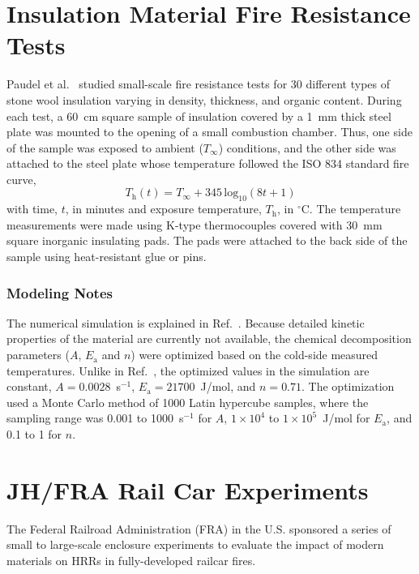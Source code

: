 \section{Insulation Material Fire Resistance Tests}
\label{Insulation_Materials_Description}

Paudel et al.~\cite{Paudel:2021} studied small-scale fire resistance tests for 30 different types of stone wool insulation varying in density, thickness, and organic content. During each test, a 60~cm square sample of insulation covered by a 1~mm thick steel plate was mounted to the opening of a small combustion chamber. Thus, one side of the sample was exposed to ambient ($ T_\infty $) conditions, and the other side was attached to the steel plate whose temperature followed the ISO 834 standard fire curve,
\begin{equation}
   T_\textrm{h}(t) = T_\infty + 345 \, \textrm{log}_{10}(8t + 1)
   \label{eq:isocurve}
\end{equation}
with time, $t$, in minutes and exposure temperature, $T_{\textrm{h}}$, in $^\circ$C. The temperature measurements were made using K-type thermocouples covered with 30~mm square inorganic insulating pads. The pads were attached to the back side of the sample using heat-resistant glue or pins.

\subsubsection{Modeling Notes}

The numerical simulation is explained in Ref.~\cite{Paudel:2021}. Because detailed kinetic properties of the material are currently not available, the chemical decomposition parameters ($A$, $E_{\textrm{a}}$ and $n$) were optimized based on the cold-side measured temperatures. Unlike in Ref.~\cite{Paudel:2021}, the optimized values in the simulation are constant, $A=0.0028$~s$^{-1}$, $E_{\textrm{a}}=21700$~J/mol, and $n=0.71$. The optimization used a Monte Carlo method of 1000 Latin hypercube samples, where the sampling range was 0.001 to 1000~s$^{-1}$ for $A$, $1\times10^4$ to $1\times10^5$~J/mol for $E_{\textrm{a}}$, and 0.1 to 1 for $n$.




\section{JH/FRA Rail Car Experiments}
\label{JH_FRA_Description}

The Federal Railroad Administration (FRA) in the U.S. sponsored a series of small to large-scale enclosure experiments to evaluate the impact of modern materials on HRRs in fully-developed railcar fires.

